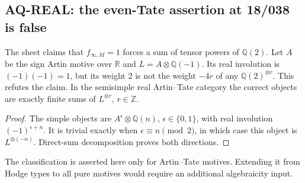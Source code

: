 \subsection{AQ-REAL: the even-Tate assertion at 18/038 is false}
The sheet claims that $f_{\infty,M}=1$ forces a sum of
tensor powers of $\mathbb Q(2)$.
Let $A$ be the sign Artin motive over $\mathbb R$ and
$L=A\otimes\mathbb Q(-1)$. Its real involution is
$(-1)(-1)=1$, but its weight $2$ is not the weight $-4r$
of any $\mathbb Q(2)^{\otimes r}$. This refutes the claim.
In the semisimple real Artin--Tate category the correct
objects are exactly finite sums of $L^{\otimes r}$,
$r\in\mathbb Z$.
\begin{proof}
The simple objects are $A^\epsilon\otimes\mathbb Q(n)$,
$\epsilon\in\{0,1\}$, with real involution
$(-1)^{\epsilon+n}$. It is trivial exactly when
$\epsilon\equiv n\pmod2$, in which case this object is
$L^{\otimes(-n)}$. Direct-sum decomposition proves both
directions.
\end{proof}
The classification is asserted here only for Artin--Tate
motives. Extending it from Hodge types to all pure motives
would require an additional algebraicity input.

